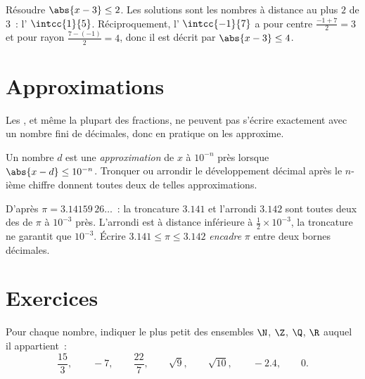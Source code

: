 \begin{example}\label{ex:g10:numbers:abs}
Résoudre $\abs{x - 3} \leq 2$. Les solutions sont les nombres à
distance au plus $2$ de $3$~: l' $\intcc{1}{5}$.
Réciproquement, l' $\intcc{-1}{7}$ a pour centre
$\frac{-1+7}{2} = 3$ et pour rayon $\frac{7-(-1)}{2} = 4$, donc il est
décrit par $\abs{x - 3} \leq 4$.
\end{example}

\section{Approximations}

Les , et même la plupart des fractions, ne peuvent
pas s'écrire exactement avec un nombre fini de décimales, donc en
pratique on les approxime.

\begin{definition}\label{def:g10:numbers:approx}
Un nombre $d$ est une \emph{approximation} de $x$
à $10^{-n}$ près lorsque $\abs{x - d} \leq 10^{-n}$. Tronquer ou
arrondir le développement décimal après le $n$-ième chiffre donnent
toutes deux de telles approximations.
\end{definition}

\begin{example}
D'après $\pi = 3.14159\,26\dots$~: la troncature $3.141$ et l'arrondi
$3.142$ sont toutes deux des  de $\pi$ à $10^{-3}$ près.
L'arrondi est à distance inférieure à $\frac12 \times 10^{-3}$, la
troncature ne garantit que $10^{-3}$. Écrire
$3.141 \leq \pi \leq 3.142$ \emph{encadre} $\pi$ entre deux bornes
décimales.
\end{example}

\section{Exercices}

\begin{exercise}[$\star$]\label{exo:g10:numbers:1}
Pour chaque nombre, indiquer le plus petit des ensembles $\N$, $\Z$,
$\Q$, $\R$ auquel il appartient~:
\[
\frac{15}{3}, \qquad -7, \qquad \frac{22}{7}, \qquad \sqrt{9}, \qquad
\sqrt{10}, \qquad -2.4, \qquad 0 .
\]
\end{exercise}

